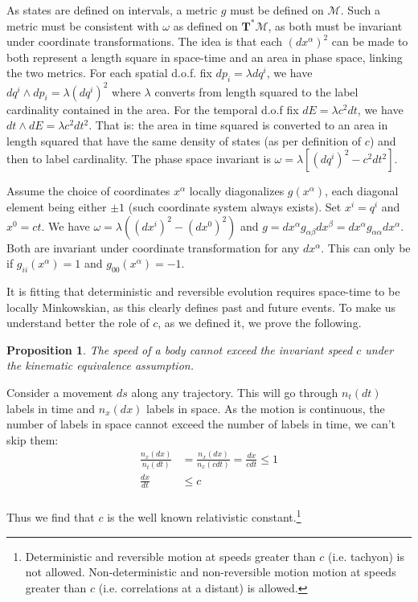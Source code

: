 \documentclass[aps,pra,10pt,twocolumn,floatfix,nofootinbib]{revtex4-1}
\newtheorem{prop}[thm]{Proposition}
\theoremstyle{definition}
\begin{document}
As states are defined on intervals, a metric $g$ must be defined on $\mathcal{M}$. Such a metric must be consistent with $\omega$ as defined on $\mathbf{T}^*\mathcal{M}$, as both must be invariant under coordinate transformations. The idea is that each $(dx^\alpha)^2$ can be made to both represent a length square in space-time and an area in phase space, linking the two metrics. For each spatial d.o.f. fix $dp_i=\lambda dq^i$, we have $dq^i \wedge dp_i = \lambda (dq^i)^2$ where $\lambda$ converts from length squared to the label cardinality contained in the area. For the temporal d.o.f fix $dE = \lambda c^2 dt$, we have $dt \wedge dE = \lambda c^2 dt^2$. That is: the area in time squared is converted to an area in length squared that have the same density of states (as per definition of $c$) and then to label cardinality. The phase space invariant is $\omega = \lambda [(dq^i)^2 - c^2 dt^2]$.

Assume the choice of coordinates $x^\alpha$ locally diagonalizes $g(x^\alpha)$, each diagonal element being either $\pm 1$ (such coordinate system always exists). Set $x^i=q^i$ and $x^0=ct$. We have $\omega = \lambda ((dx^i)^2 - (dx^0)^2)$ and $g=dx^\alpha g_{\alpha \beta} dx^\beta=dx^\alpha g_{\alpha \alpha}dx^\alpha$. Both are invariant under coordinate transformation for any $dx^\alpha$. This can only be if $g_{ii}(x^\alpha)=1$ and $g_{00}(x^\alpha)=-1$.

It is fitting that deterministic and reversible evolution requires space-time to be locally Minkowskian, as this clearly defines past and future events. To make us understand better the role of $c$, as we defined it, we prove the following.

\begin{prop}\label{speedLimit}
The speed of a body cannot exceed the invariant speed $c$ under the kinematic equivalence assumption.
\end{prop}

Consider a movement $ds$ along any trajectory. This will go through $n_t(dt)$ labels in time and $n_x(dx)$ labels in space. As the motion is continuous, the number of labels in space cannot exceed the number of labels in time, we can't skip them:
\begin{align*}
\frac{n_x(dx)}{n_t(dt)} &= \frac{n_x(dx)}{n_x(c dt)} = \frac{dx}{c dt} \leq 1 \\
\frac{dx}{dt} & \leq c \\
\end{align*}

Thus we find that $c$ is the well known relativistic constant.\footnote{Deterministic and reversible motion at speeds greater than $c$ (i.e. tachyon) is not allowed. Non-deterministic and non-reversible motion motion at speeds greater than $c$ (i.e. correlations at a distant) is allowed.}
\end{document}
